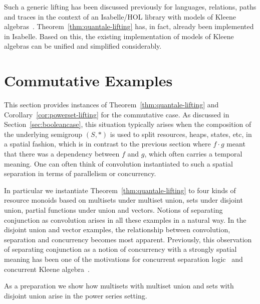 \documentclass[12pt]{article}
\theoremstyle{definition}
\begin{document}
Such a generic lifting has been discussed previously for languages,
relations, paths and traces in the context of an Isabelle/HOL library
with models of Kleene
algebras~\cite{ArmstrongSW-JLAMP,ArmstrongSW13}. Theorem~\ref{thm:quantale-lifting}
has, in fact, already been implemented in Isabelle.  Based on this,
the existing implementation of models of Kleene algebras can be
unified and simplified considerably.








\section{Commutative Examples}\label{sec:fpscomquantaleexamples}

This section provides instances of Theorem~\ref{thm:quantale-lifting}
and Corollary~\ref{cor:powerset-lifting} for the commutative case. As
discussed in Section~\ref{sec:booleancase},  this situation typically
arises when the composition of the underlying semigroup $(S,\ast)$ is
used to split resources, heaps, states, etc, in a spatial fashion,
which is in contrast to the previous section where $f \cdot g$ meant
that there was a dependency between $f$ and $g$, which often carries a
temporal meaning. One can often think of convolution instantiated to
such a spatial separation in terms of parallelism or concurrency.

In particular we instantiate Theorem~\ref{thm:quantale-lifting} to
four kinds of resource monoids based on multisets under multiset
union, sets under disjoint union, partial functions under union and
vectors. Notions of separating conjunction as convolution arises in
all these examples in a natural way. In the disjoint union and vector
examples, the relationship between convolution, separation and
concurrency becomes most apparent.  Previously, this observation of
separating conjunction as a notion of concurrency with a strongly
spatial meaning has been one of the motivations for concurrent
separation logic~\cite{COY07} and concurrent Kleene
algebra~\cite{HMSW11}.

As a preparation we show how multisets with multiset union
and sets with disjoint union arise in the power series
setting.
\end{document}
